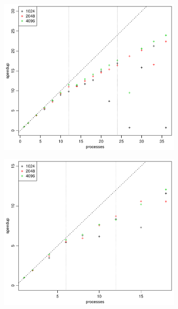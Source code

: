\documentclass[norsk]{article} %
\numberwithin{equation}{section} %
\numberwithin{figure}{section} %
\numberwithin{table}{section} %
\begin{document}
\begin{figure}[h!]
  \centering
  \begin{subfigure}[b]{0.48\textwidth}
    \includegraphics[width=\textwidth]{./Figures/taskbSpeedupProc1.pdf}
  \end{subfigure}%
  \quad
  \begin{subfigure}[b]{0.48\textwidth}
    \includegraphics[width=\textwidth]{./Figures/taskbSpeedupProc2.pdf}
  \end{subfigure}

\end{figure}
\end{document}
